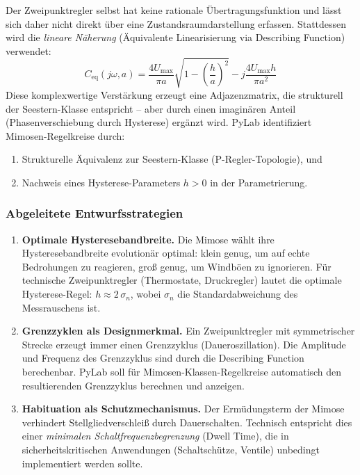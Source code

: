 \documentclass[a4paper,12pt]{article}
\theoremstyle{definition}
\begin{document}
Der Zweipunktregler selbst hat keine rationale Übertragungsfunktion und
lässt sich daher nicht direkt über eine Zustandsraumdarstellung erfassen.
Stattdessen wird die \emph{lineare Näherung} (Äquivalente Linearisierung via
Describing Function) verwendet:
\[
C_{\text{eq}}(j\omega, a) = \frac{4 U_{\max}}{\pi a} \sqrt{1 - \left(\frac{h}{a}\right)^2}
- j\frac{4 U_{\max} h}{\pi a^2}
\]
Diese komplexwertige Verstärkung erzeugt eine Adjazenzmatrix, die strukturell
der Seestern-Klasse entspricht -- aber durch einen imaginären Anteil
(Phasenverschiebung durch Hysterese) ergänzt wird. PyLab identifiziert
Mimosen-Regelkreise durch:
\begin{enumerate}
	\item Strukturelle Äquivalenz zur Seestern-Klasse (P-Regler-Topologie), und
	\item Nachweis eines Hysterese-Parameters $h > 0$ in der Parametrierung.
\end{enumerate}

\subsubsection{Abgeleitete Entwurfsstrategien}

\begin{enumerate}
	\item \textbf{Optimale Hysteresebandbreite.}
	Die Mimose wählt ihre Hysteresebandbreite evolutionär optimal:
	klein genug, um auf echte Bedrohungen zu reagieren, groß genug,
	um Windböen zu ignorieren. Für technische Zweipunktregler
	(Thermostate, Druckregler) lautet die optimale Hysterese-Regel:
	$h \approx 2\,\sigma_n$, wobei $\sigma_n$ die Standardabweichung
	des Messrauschens ist.
	
	\item \textbf{Grenzzyklen als Designmerkmal.}
	Ein Zweipunktregler mit symmetrischer Strecke erzeugt immer einen
	Grenzzyklus (Daueroszillation). Die Amplitude und Frequenz des
	Grenzzyklus sind durch die Describing Function berechenbar.
	PyLab soll für Mimosen-Klassen-Regelkreise automatisch den
	resultierenden Grenzzyklus berechnen und anzeigen.
	
	\item \textbf{Habituation als Schutzmechanismus.}
	Der Ermüdungsterm der Mimose verhindert Stellgliedverschleiß durch
	Dauerschalten. Technisch entspricht dies einer \emph{minimalen
		Schaltfrequenzbegrenzung} (Dwell Time), die in sicherheitskritischen
	Anwendungen (Schaltschütze, Ventile) unbedingt implementiert werden
	sollte.
\end{enumerate}
\end{document}
